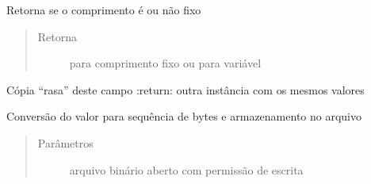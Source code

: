 \documentclass[letterpaper,10pt,brazil]{sphinxmanual}
\begin{document}
\begin{fulllineitems}
\begin{fulllineitems}
\begin{quote}
\begin{description}
\end{description}\end{quote}

\end{fulllineitems}


\begin{fulllineitems}
\label{\detokenize{index:estrutarq.campo.campo_comum.CampoBasico.comprimento_fixo}}
\pysigstartsignatures
{}
\pysigstopsignatures
\sphinxAtStartPar
Retorna se o comprimento é ou não fixo
\begin{quote}\begin{description}
\item[{Retorna}] \leavevmode
\sphinxAtStartPar
{} para comprimento fixo ou  para variável

\end{description}\end{quote}

\end{fulllineitems}


\begin{fulllineitems}
\label{\detokenize{index:estrutarq.campo.campo_comum.CampoBasico.copy}}
\pysigstartsignatures
{}
\pysigstopsignatures
\sphinxAtStartPar
Cópia “rasa” deste campo
:return: outra instância com os mesmos valores

\end{fulllineitems}


\begin{fulllineitems}
\label{\detokenize{index:estrutarq.campo.campo_comum.CampoBasico.escreva}}
\pysigstartsignatures
{}
\pysigstopsignatures
\sphinxAtStartPar
Conversão do valor para sequência de bytes e armazenamento no
arquivo
\begin{quote}\begin{description}
\item[{Parâmetros}] \leavevmode
\sphinxAtStartPar
{} \textendash{} arquivo binário aberto com permissão de escrita


\end{description}
\end{quote}
\end{fulllineitems}
\end{fulllineitems}
\end{document}
